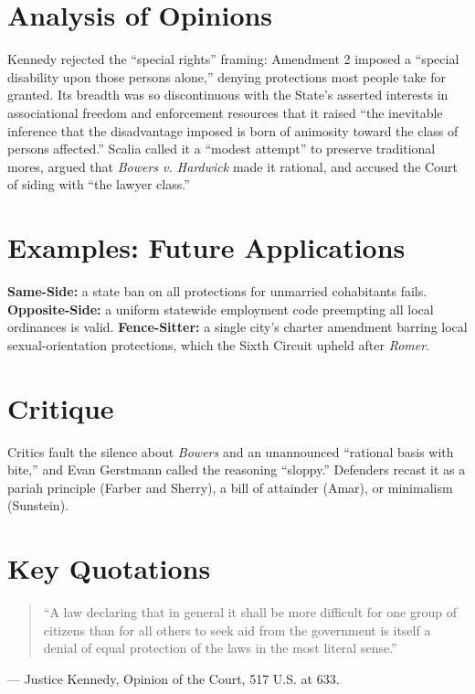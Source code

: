 \documentclass[12pt]{article}
\begin{document}
\section{Analysis of Opinions}
Kennedy rejected the ``special rights'' framing: Amendment 2 imposed a ``special disability upon those persons alone,'' denying protections most people take for granted. Its breadth was so discontinuous with the State's asserted interests in associational freedom and enforcement resources that it raised ``the inevitable inference that the disadvantage imposed is born of animosity toward the class of persons affected.'' Scalia called it a ``modest attempt'' to preserve traditional mores, argued that \textit{Bowers v. Hardwick} made it rational, and accused the Court of siding with ``the lawyer class.''

\section{Examples: Future Applications}
\textbf{Same-Side:} a state ban on all protections for unmarried cohabitants fails. \textbf{Opposite-Side:} a uniform statewide employment code preempting all local ordinances is valid. \textbf{Fence-Sitter:} a single city's charter amendment barring local sexual-orientation protections, which the Sixth Circuit upheld after \textit{Romer}.

\section{Critique}
Critics fault the silence about \textit{Bowers} and an unannounced ``rational basis with bite,'' and Evan Gerstmann called the reasoning ``sloppy.'' Defenders recast it as a pariah principle (Farber and Sherry), a bill of attainder (Amar), or minimalism (Sunstein).

\section{Key Quotations}
\begin{quote}
``A law declaring that in general it shall be more difficult for one group of citizens than for all others to seek aid from the government is itself a denial of equal protection of the laws in the most literal sense.''
\end{quote}
\noindent --- Justice Kennedy, Opinion of the Court, 517 U.S. at 633.
\end{document}
